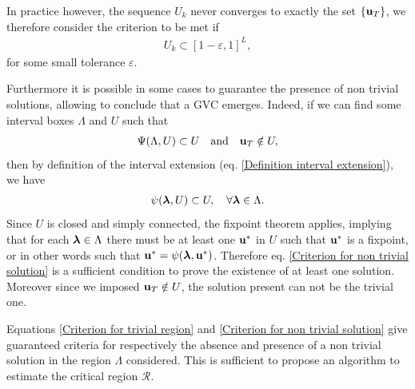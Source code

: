 \documentclass[
11pt, %
english, %
singlespacing, %
nolistspacing, %
liststotoc, %
headsepline, %
]{MastersDoctoralThesis} %
\begin{document}
In practice however, the sequence $U_k$ never converges to exactly the set $\{\boldsymbol{\mathrm{u}}_T\}$, we therefore consider the criterion to be met if
\begin{align}
	U_k \subset [1 - \varepsilon, 1]^L, \label{Criterion for trivial region}
\end{align}
for some small tolerance $\varepsilon$.

Furthermore it is possible in some cases to guarantee the presence of non trivial solutions, allowing to conclude that a GVC emerges. Indeed, if we can find some interval boxes $\Lambda$ and $U$ such that
\begin{align}
	\Psi(\Lambda, U) \subset U \quad \text{and} \quad \boldsymbol{\mathrm{u}}_T \notin U, \label{Criterion for non trivial solution}
\end{align}
then by definition of the interval extension (eq. \eqref{Definition interval extension}), we have
\begin{align}
	\psi(\boldsymbol{\mathrm{\lambda}}, U) \subset U, \quad \forall \boldsymbol{\mathrm{\lambda}} \in \Lambda.
\end{align}
Since $U$ is closed and simply connected, the fixpoint theorem \missingref{} applies, implying that for each $\boldsymbol{\mathrm{\lambda}} \in \Lambda$ there must be at least one $\boldsymbol{\mathrm{u}}^*$ in $U$ such that $\boldsymbol{\mathrm{u}}^*$ is a fixpoint, or in other words such that $\boldsymbol{\mathrm{u}}^* = \psi(\boldsymbol{\mathrm{\lambda}}, \boldsymbol{\mathrm{u}}^*)$. Therefore eq. \eqref{Criterion for non trivial solution} is a sufficient condition to prove the existence of at least one solution. Moreover since we imposed $\boldsymbol{\mathrm{u}}_T \notin U$, the solution present can not be the trivial one.

Equations \eqref{Criterion for trivial region} and \eqref{Criterion for non trivial solution} give guaranteed criteria for respectively the absence and presence of a non trivial solution in the region $\Lambda$ considered. This is sufficient to propose an algorithm to estimate the critical region $\mathcal{R}$.
\end{document}
